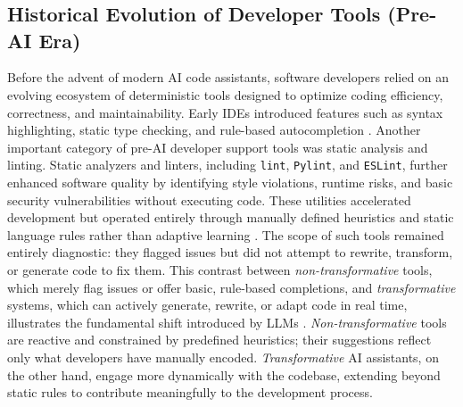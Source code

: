 \chapter{}%
\label{ch:stand-van-zaken}



\section{Historical Evolution of Developer Tools (Pre-AI Era)}
\label{sec:historical-developer-tools}
Before the advent of modern \gls{AI} code assistants, software developers relied on an evolving ecosystem of deterministic tools designed to optimize coding efficiency, correctness, and maintainability. Early \glspl{IDE} introduced features such as syntax highlighting, static type checking, and rule-based autocompletion \autocite{Murphy2006IDEUsage}. Another important category of pre-\gls{AI} developer support tools was static analysis and linting. Static analyzers and linters, including \texttt{lint}, \texttt{Pylint}, and \texttt{ESLint}, further enhanced software quality by identifying style violations, runtime risks, and basic security vulnerabilities without executing code. These utilities accelerated development but operated entirely through manually defined heuristics and static language rules rather than adaptive learning \autocite{Ayewah2008}. The scope of such tools remained entirely diagnostic: they flagged issues but did not attempt to rewrite, transform, or generate code to fix them. This contrast between \emph{non-transformative} tools, which merely flag issues or offer basic, rule-based completions, and \emph{transformative} systems, which can actively generate, rewrite, or adapt code in real time, illustrates the fundamental shift introduced by \glspl{LLM} \autocite{xu2022systematic}. \emph{Non-transformative}  tools are reactive and constrained by predefined heuristics; their suggestions reflect only what developers have manually encoded. \emph{Transformative} \gls{AI} assistants, on the other hand, engage more dynamically with the codebase, extending beyond static rules to contribute meaningfully to the development process.

